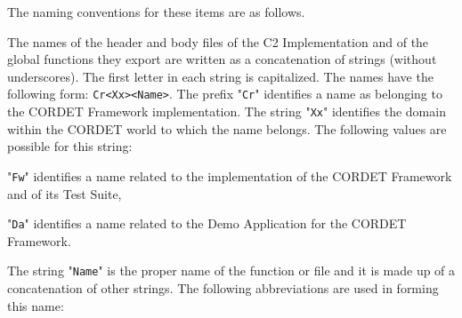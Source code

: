 \documentclass[a4paper,10pt]{article}
\newenvironment{fw_itemize}						%
{\begin{itemize}
  \setlength{\itemsep}{1mm}
  \setlength{\parskip}{0pt}
  \setlength{\parsep}{0pt}}
{\end{itemize}}
\begin{document}
The naming conventions for these items are as follows.
 
The names of the header and body files of the C2 Implementation and of the global 
functions they export are written as a concatenation of strings (without underscores). 
The first letter in each string is capitalized. The names have the following form: 
\texttt{Cr<Xx><Name>}. The prefix "\texttt{Cr}" identifies a name as belonging to the CORDET Framework implementation. 
The string "\texttt{Xx}" identifies the domain within the CORDET world 
to which the name belongs. The following values are possible for this string: 

\begin{fw_itemize}
\item "\texttt{Fw}" identifies a name related to the implementation of the CORDET Framework and of its Test Suite, 
\item "\texttt{Da}" identifies a name related to the Demo Application for the CORDET Framework.
\end{fw_itemize}

The string "\texttt{Name}" is the proper name of the function or file and it is made up of a concatenation of other strings. The following abbreviations are used in forming this name:
\end{document}

